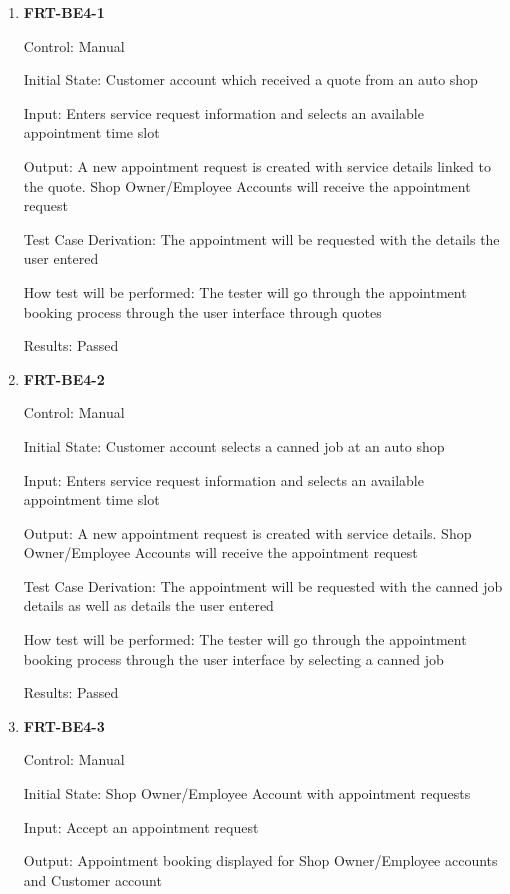 \documentclass[12pt, titlepage]{article}
\begin{document}
\begin{enumerate}

	\item \textbf{FRT-BE4-1}

	      Control: Manual

	      Initial State: Customer account which received a quote from an auto shop

	      Input: Enters service request information and selects an available appointment time slot

	      Output: A new appointment request is created with service details linked to the quote. Shop
	      Owner/Employee Accounts will receive the appointment request

	      Test Case Derivation: The appointment will be requested with the details the user entered

	      How test will be performed: The tester will go through the appointment booking process through the
	      user interface through quotes

	      Results: Passed

	\item \textbf{FRT-BE4-2}

	      Control: Manual

	      Initial State: Customer account selects a canned job at an auto shop

	      Input: Enters service request information and selects an available appointment time slot

	      Output: A new appointment request is created with service details. Shop Owner/Employee Accounts
	      will receive the appointment request

	      Test Case Derivation: The appointment will be requested with the canned job details as well as
	      details the user entered

	      How test will be performed: The tester will go through the appointment booking process through the
	      user interface by selecting a canned job

	      Results: Passed

	\item \textbf{FRT-BE4-3}

	      Control: Manual

	      Initial State: Shop Owner/Employee Account with appointment requests

	      Input: Accept an appointment request

	      Output: Appointment booking displayed for Shop Owner/Employee accounts and Customer account


\end{enumerate}
\end{document}
